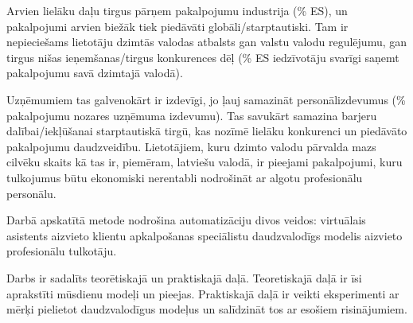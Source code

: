 Arvien lielāku daļu tirgus pārņem pakalpojumu industrija (\% ES), un pakalpojumi arvien biežāk tiek piedāvāti globāli/starptautiski. Tam ir nepieciešams lietotāju dzimtās valodas atbalsts gan valstu valodu regulējumu, gan tirgus nišas ieņemšanas/tirgus konkurences dēļ (\% ES iedzīvotāju svarīgi saņemt pakalpojumu savā dzimtajā valodā). 

Uzņēmumiem tas galvenokārt ir izdevīgi, jo ļauj samazināt personālizdevumus (\% pakalpojumu nozares uzņēmuma izdevumu). Tas savukārt samazina barjeru dalībai/iekļūšanai starptautiskā tirgū, kas nozīmē lielāku konkurenci un piedāvāto pakalpojumu daudzveidību. Lietotājiem, kuru dzimto valodu pārvalda mazs cilvēku skaits kā tas ir, piemēram, latviešu valodā, ir pieejami pakalpojumi, kuru tulkojumus būtu ekonomiski nerentabli nodrošināt ar algotu profesionālu personālu.

Darbā apskatītā metode nodrošina automatizāciju divos veidos: 
virtuālais asistents aizvieto klientu apkalpošanas speciālistu
daudzvalodīgs modelis aizvieto profesionālu tulkotāju.

Darbs ir sadalīts teorētiskajā un praktiskajā daļā. Teoretiskajā daļā ir īsi
aprakstīti mūsdienu modeļi un pieejas. Praktiskajā daļā ir veikti eksperimenti ar mērķi pielietot daudzvalodīgus modeļus un salīdzināt tos ar esošiem risinājumiem. 
